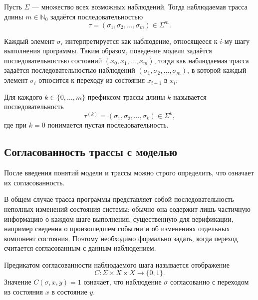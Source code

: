 \begin{definition}\label{def:tau}
Пусть $\Sigma$ --- множество всех возможных наблюдений. Тогда наблюдаемая
трасса длины $m \in \mathbb{N}_0$ задаётся последовательностью
\begin{equation}\label{f4}
\tau = (\sigma_1,\sigma_2,\dots,\sigma_m) \in \Sigma^m.
\end{equation}
\end{definition}

Каждый элемент $\sigma_i$ интерпретируется как наблюдение, относящееся к $i$-му
шагу выполнения программы. Таким образом, поведение модели задаётся
последовательностью состояний $(x_0,x_1,\dots,x_m)$, тогда как наблюдаемая
трасса задаётся последовательностью наблюдений
$(\sigma_1,\sigma_2,\dots,\sigma_m)$, в которой каждый элемент $\sigma_i$
относится к переходу из состояния $x_{i-1}$ в $x_i$.

\begin{definition}
Для каждого $k \in \{0,\dots,m\}$ префиксом трассы длины $k$ называется
последовательность
\[
\tau^{(k)} = (\sigma_1,\sigma_2,\dots,\sigma_k) \in \Sigma^k,
\]
где при $k=0$ понимается пустая последовательность.
\end{definition}

\subsection{Согласованность трассы с моделью}

После введения понятий модели и трассы можно строго определить, что означает их
согласованность.

В общем случае трасса программы представляет собой последовательность неполных
изменений состояния системы: обычно она содержит лишь частичную информацию о
каждом шаге выполнения, существенную для верификации, например сведения о
произошедшем событии и об изменениях отдельных компонент состояния. Поэтому
необходимо формально задать, когда переход считается согласованным с данным
наблюдением.

\begin{definition}\label{def:sogl}
Предикатом согласованности наблюдаемого шага называется отображение
\begin{equation}\label{f5}
C : \Sigma \times X \times X \to \{0,1\}.
\end{equation}
Значение $C(\sigma,x,y)=1$ означает, что наблюдение $\sigma$ согласованно с
переходом из состояния $x$ в состояние $y$.
\end{definition}

